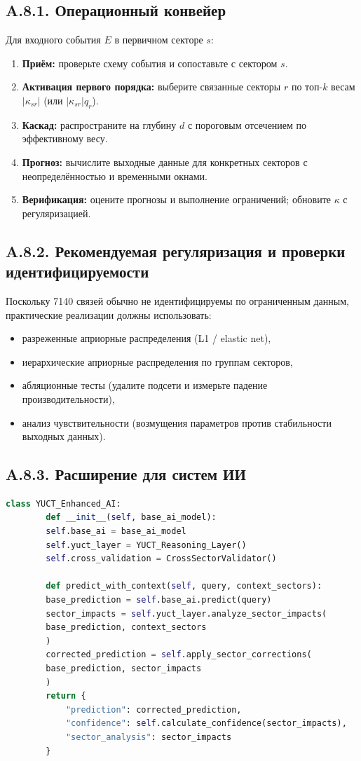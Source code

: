 \documentclass[11pt,a4paper]{article}
\begin{document}
	\subsection*{A.8.1. Операционный конвейер}
	Для входного события $E$ в первичном секторе $s$:
	\begin{enumerate}[leftmargin=*]
		\item \textbf{Приём:} проверьте схему события и сопоставьте с сектором $s$.
		\item \textbf{Активация первого порядка:} выберите связанные секторы $r$ по топ-$k$ весам $|\kappa_{sr}|$ (или $|\kappa_{sr}|q_r$).
		\item \textbf{Каскад:} распространите на глубину $d$ с пороговым отсечением по эффективному весу.
		\item \textbf{Прогноз:} вычислите выходные данные для конкретных секторов с неопределённостью и временными окнами.
		\item \textbf{Верификация:} оцените прогнозы и выполнение ограничений; обновите $\kappa$ с регуляризацией.
	\end{enumerate}
	
	\subsection*{A.8.2. Рекомендуемая регуляризация и проверки идентифицируемости}
	Поскольку 7140 связей обычно не идентифицируемы по ограниченным данным, практические реализации должны использовать:
	\begin{itemize}[leftmargin=*]
		\item разреженные априорные распределения (L1 / elastic net),
		\item иерархические априорные распределения по группам секторов,
		\item абляционные тесты (удалите подсети и измерьте падение производительности),
		\item анализ чувствительности (возмущения параметров против стабильности выходных данных).
	\end{itemize}
	
	\subsection*{A.8.3. Расширение для систем ИИ}
	
	\begin{lstlisting}[language=Python]
		class YUCT_Enhanced_AI:
		def __init__(self, base_ai_model):
		self.base_ai = base_ai_model
		self.yuct_layer = YUCT_Reasoning_Layer()
		self.cross_validation = CrossSectorValidator()
		
		def predict_with_context(self, query, context_sectors):
		base_prediction = self.base_ai.predict(query)
		sector_impacts = self.yuct_layer.analyze_sector_impacts(
		base_prediction, context_sectors
		)
		corrected_prediction = self.apply_sector_corrections(
		base_prediction, sector_impacts
		)
		return {
			"prediction": corrected_prediction,
			"confidence": self.calculate_confidence(sector_impacts),
			"sector_analysis": sector_impacts
		}
	\end{lstlisting}
	
\end{document}
